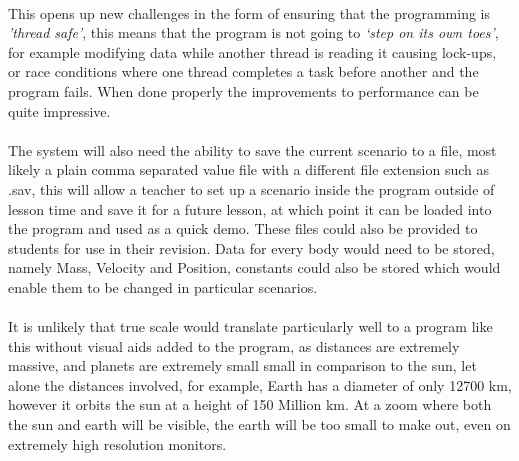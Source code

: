 \paragraph{} 
This opens up new challenges in the form of ensuring that the programming is \textit{'thread safe'}, this means that the program is not going to \textit{‘step on its own toes’}, for example modifying data while another thread is reading it causing lock-ups, or race conditions where one thread completes a task before another and the program fails. When done properly the improvements to performance can be quite impressive.

\paragraph{}
The system will also need the ability to save the current scenario to a file, most likely a plain comma separated value file with a different file extension such as .sav, this will allow a teacher to set up a scenario inside the program outside of lesson time and save it for a future lesson, at which point it can be loaded into the program and used as a quick demo. These files could also be provided to students for use in their revision. Data for every body would need to be stored, namely Mass, Velocity and Position, constants could also be stored which would enable them to be changed in particular scenarios.

\paragraph{}
It is unlikely that true scale would translate particularly well to a program like this without visual aids added to the program, as distances are extremely massive, and planets are extremely small small in comparison to the sun, let alone the distances involved, for example, Earth has a diameter of only 12700 km, however it orbits the sun at a height of 150 Million km. At a zoom where both the sun and earth will be visible, the earth will be too small to make out, even on extremely high resolution monitors.

